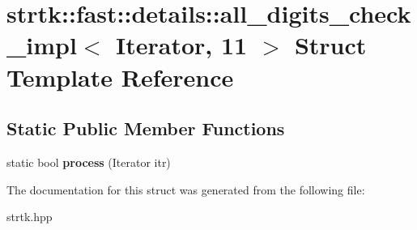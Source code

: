 \hypertarget{structstrtk_1_1fast_1_1details_1_1all__digits__check__impl_3_01Iterator_00_0111_01_4}{\section{strtk\-:\-:fast\-:\-:details\-:\-:all\-\_\-digits\-\_\-check\-\_\-impl$<$ Iterator, 11 $>$ Struct Template Reference}
\label{structstrtk_1_1fast_1_1details_1_1all__digits__check__impl_3_01Iterator_00_0111_01_4}
}
\subsection*{Static Public Member Functions}
\begin{DoxyCompactItemize}
\item 
\hypertarget{structstrtk_1_1fast_1_1details_1_1all__digits__check__impl_3_01Iterator_00_0111_01_4_a52684b9688854eec0696a15ac764be96}{static bool {\bfseries process} (Iterator itr)}\label{structstrtk_1_1fast_1_1details_1_1all__digits__check__impl_3_01Iterator_00_0111_01_4_a52684b9688854eec0696a15ac764be96}

\end{DoxyCompactItemize}


The documentation for this struct was generated from the following file\-:\begin{DoxyCompactItemize}
\item 
strtk.\-hpp\end{DoxyCompactItemize}
